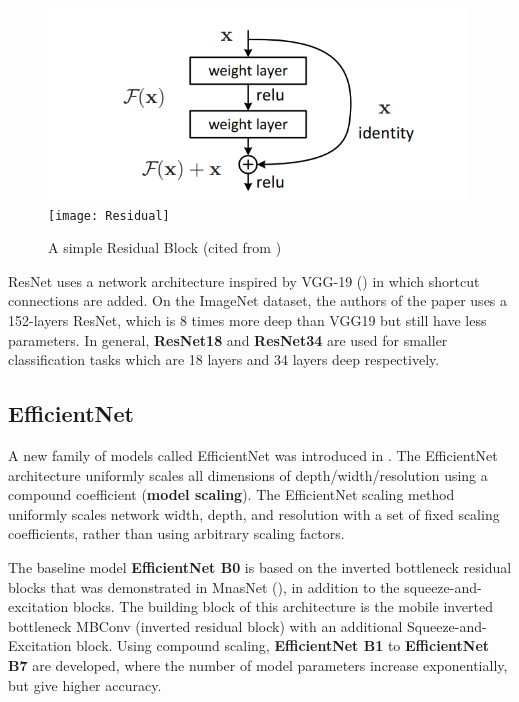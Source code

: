 \begin{figure}[H]
  \begin{center}
    \leavevmode
    \ifpdf
      \includegraphics[height=2in]{Experimental/Chapter2Figs/residual_block.PNG}
    \else
      \texttt{[image: Residual]}
    \fi
    \caption{A simple Residual Block (cited from \cite{resnet})}
    \label{Residual}
  \end{center}
\end{figure}

ResNet uses a network architecture inspired by VGG-19 (\cite{vcg19}) in which shortcut connections are added. On the ImageNet dataset,  the authors of the paper uses a 152-layers ResNet, which is 8 times more deep than VGG19 but still have less parameters. In general, \textbf{ResNet18} and \textbf{ResNet34} are used for smaller classification tasks which are 18 layers and 34 layers deep respectively.


\subsection{EfficientNet}
\vspace*{3mm}
A new family of models called EfficientNet was introduced in \cite{effnet}. The EfficientNet architecture uniformly scales all dimensions of depth/width/resolution using a compound coefficient (\textbf{model scaling}). The EfficientNet scaling method uniformly scales network width, depth, and resolution with a set of fixed scaling coefficients, rather than using arbitrary scaling factors.
\vspace*{3mm}

The baseline model \textbf{EfficientNet B0} is based on the inverted bottleneck residual blocks that was demonstrated in MnasNet (\cite{mnasnet}), in addition to the squeeze-and-excitation blocks. The building block of this architecture is the mobile inverted bottleneck MBConv  (inverted residual block) with an additional Squeeze-and-Excitation block. Using compound scaling, \textbf{ EfficientNet B1} to \textbf{EfficientNet B7} are developed, where the number of model parameters increase exponentially, but give higher accuracy. 




